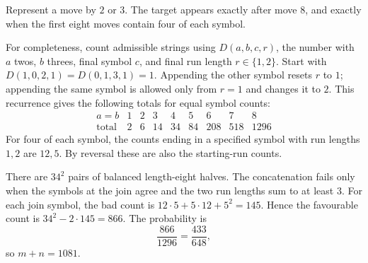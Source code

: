 Represent a move by $2$ or $3$. The target appears exactly after move $8$, and exactly when the first eight moves contain four of each symbol.

For completeness, count admissible strings using $D(a,b,c,r)$, the number with $a$ twos, $b$ threes, final symbol $c$, and final run length $r\in\{1,2\}$. Start with $D(1,0,2,1)=D(0,1,3,1)=1$. Appending the other symbol resets $r$ to $1$; appending the same symbol is allowed only from $r=1$ and changes it to $2$. This recurrence gives the following totals for equal symbol counts:
\[
\begin{array}{c|rrrrrrrr}
a=b&1&2&3&4&5&6&7&8\\\hline
\text{total}&2&6&14&34&84&208&518&1296
\end{array}
\]
For four of each symbol, the counts ending in a specified symbol with run lengths $1,2$ are $12,5$. By reversal these are also the starting-run counts.

There are $34^2$ pairs of balanced length-eight halves. The concatenation fails only when the symbols at the join agree and the two run lengths sum to at least $3$. For each join symbol, the bad count is $12\cdot5+5\cdot12+5^2=145$. Hence the favourable count is $34^2-2\cdot145=866$. The probability is
\[
\dfrac{866}{1296}=\dfrac{433}{648},
\]
so $\boxed{m+n=1081}$.
